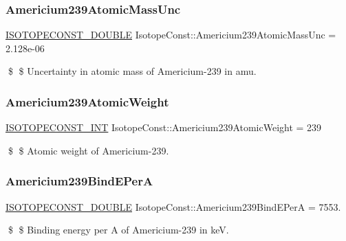 \subsubsection{\texorpdfstring{Americium239\+Atomic\+Mass\+Unc}{Americium239AtomicMassUnc}}
{\footnotesize\ttfamily \mbox{\hyperlink{group___isotope_const-_macros_ga8f45a7272ce02c0b4c65c44636ed719a}{I\+S\+O\+T\+O\+P\+E\+C\+O\+N\+S\+T\+\_\+\+D\+O\+U\+B\+LE}} Isotope\+Const\+::\+Americium239\+Atomic\+Mass\+Unc = 2.\+128e-\/06}

\$ \$ Uncertainty in atomic mass of Americium-\/239 in amu. \mbox{\label{group___isotope_const-_americium-_am239_gadb26614f921e078e5e5812ee66eed771}} 
\subsubsection{\texorpdfstring{Americium239\+Atomic\+Weight}{Americium239AtomicWeight}}
{\footnotesize\ttfamily \mbox{\hyperlink{group___isotope_const-_macros_ga5f18360b3e99483a35c32d789e62621c}{I\+S\+O\+T\+O\+P\+E\+C\+O\+N\+S\+T\+\_\+\+I\+NT}} Isotope\+Const\+::\+Americium239\+Atomic\+Weight = 239}

\$ \$ Atomic weight of Americium-\/239. \mbox{\label{group___isotope_const-_americium-_am239_gaf845a7d9ccbfa816853a573a3c6f7569}} 
\subsubsection{\texorpdfstring{Americium239\+Bind\+E\+PerA}{Americium239BindEPerA}}
{\footnotesize\ttfamily \mbox{\hyperlink{group___isotope_const-_macros_ga8f45a7272ce02c0b4c65c44636ed719a}{I\+S\+O\+T\+O\+P\+E\+C\+O\+N\+S\+T\+\_\+\+D\+O\+U\+B\+LE}} Isotope\+Const\+::\+Americium239\+Bind\+E\+PerA = 7553.}

\$ \$ Binding energy per A of Americium-\/239 in keV. \mbox{\label{group___isotope_const-_americium-_am239_ga1caca33625b5238402e9d33dc60918bf}} 
